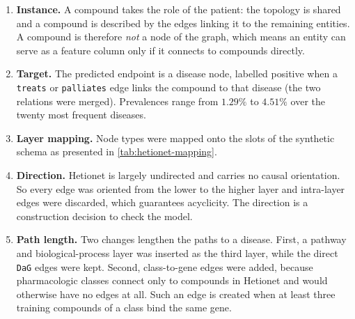 \begin{enumerate}[label=(\roman*)]
  \item \textbf{Instance.} A compound takes the role of the patient: the
    topology is shared and a compound is described by the edges linking it to
    the remaining entities. A compound is therefore \emph{not} a node of the
    graph, which means an entity can serve as a feature column only if it
    connects to compounds directly.

  \item \textbf{Target.} The predicted endpoint is a disease node, labelled positive when a
  \texttt{treats} or \texttt{palliates} edge links the compound to that disease
  (the two relations were merged).
  Prevalences range from $1.29\%$ to $4.51\%$ over the twenty most frequent
  diseases. 

  \item \textbf{Layer mapping.} Node types were mapped onto the slots of the
    synthetic schema as presented in \cref{tab:hetionet-mapping}.

  \item \textbf{Direction.} Hetionet is largely undirected and
    carries no causal orientation. So every
    edge was oriented from the lower to the higher layer and intra-layer edges
    were discarded, which guarantees acyclicity. The direction is a
    construction decision to check the model. 

  \item \textbf{Path length.} Two changes lengthen the paths to a disease. First, a pathway and
  biological-process layer was inserted as the third layer, while the direct
  \texttt{DaG} edges were kept. Second, class-to-gene edges were added, because
  pharmacologic classes connect only to compounds in Hetionet and would otherwise
  have no edges at all. Such an edge is created when at least three training
  compounds of a class bind the same gene.

\end{enumerate}

